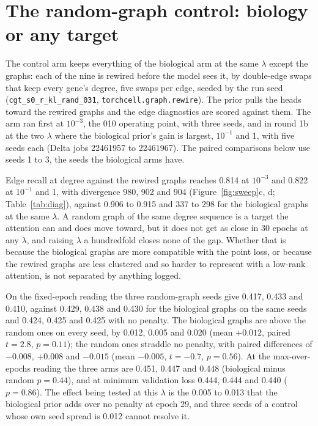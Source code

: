 
\section{The random-graph control: biology or any target}
\label{sec:control}

The control arm keeps everything of the biological arm at the same $\lambda$ except the
graphs: each of the nine is rewired before the model sees it, by double-edge swaps that
keep every gene's degree, five swaps per edge, seeded by the run seed
(\texttt{cgt\_s0\_r\_kl\_rand\_031}, \texttt{torchcell.graph.rewire}). The prior pulls
the heads toward the rewired graphs and the edge diagnostics are scored against them.
The arm ran first at $10^{-3}$, the 010 operating point, with three seeds, and in round
1b at the two $\lambda$ where the biological prior's gain is largest, $10^{-1}$ and 1,
with five seeds each (Delta jobs 22461957 to 22461967). The paired comparisons below use
seeds 1 to 3, the seeds the biological arms have.

Edge recall at degree against the rewired graphs reaches 0.814 at $10^{-3}$ and 0.822 at
$10^{-1}$ and 1, with divergence 980, 902 and 904 (Figure~\ref{fig:sweep}c, d;
Table~\ref{tab:diag}), against 0.906 to 0.915 and 337 to 298 for the biological graphs at
the same $\lambda$. A random graph of the same degree sequence is a target the attention
can and does move toward, but it does not get as close in 30 epochs at any $\lambda$,
and raising $\lambda$ a hundredfold closes none of the gap. Whether that is because the
biological graphs are more compatible with the point loss, or because the rewired graphs
are less clustered and so harder to represent with a low-rank attention, is not separated
by anything logged.

On the fixed-epoch reading the three random-graph seeds give 0.417, 0.433 and 0.410,
against 0.429, 0.438 and 0.430 for the biological graphs on the same seeds and 0.424,
0.425 and 0.425 with no penalty. The biological graphs are above the random ones on every
seed, by 0.012, 0.005 and 0.020 (mean $+0.012$, paired $t = 2.8$, $p = 0.11$); the random
ones straddle no penalty, with paired differences of $-0.008$, $+0.008$ and $-0.015$
(mean $-0.005$, $t = -0.7$, $p = 0.56$). At the max-over-epochs reading the three arms
are 0.451, 0.447 and 0.448 (biological minus random $p = 0.44$), and at minimum
validation loss 0.444, 0.444 and 0.440 ($p = 0.86$). The effect being tested at this
$\lambda$ is the 0.005 to 0.013 that the biological prior adds over no penalty at epoch
29, and three seeds of a control whose own seed spread is 0.012 cannot resolve it.

